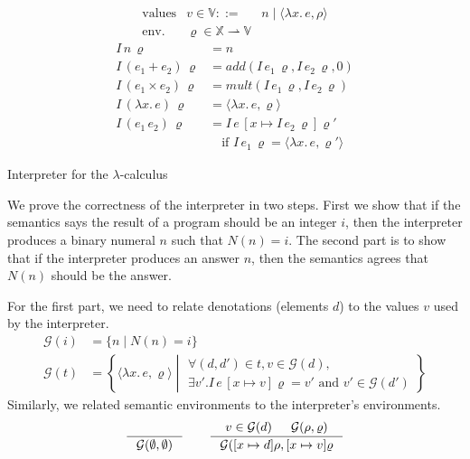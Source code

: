 \documentclass{tufte-handout}
\newcommand{\LAM}[1]{\lambda #1.\,}
\newcommand{\pto}[0]{\rightharpoonup}
\begin{document}
\begin{marginfigure}
\[
\begin{array}{lrl}
 \text{values} & v \in \mathbb{V} ::= & n \mid \langle \LAM{x}e, \rho \rangle \\
 \text{env.} & \varrho \in \mathbb{X} \pto \mathbb{V} 
\end{array}
\]
\begin{align*}
  I\,n\,\varrho &= n \\
  I\,(e_1 + e_2)\,\varrho &= \mathit{add}(I\,e_1\,\varrho, I\,e_2\,\varrho, 0) \\
  I\,(e_1 \times e_2)\,\varrho &= \mathit{mult}(I\,e_1\,\varrho, I\,e_2\,\varrho) \\
  I\,(\LAM{x}e)\,\varrho &= \langle \LAM{x}e, \varrho \rangle \\
  I\,(e_1\,e_2)\,\varrho &=  I\,e\,[x\mapsto I\,e_2\,\varrho]\varrho'\\
      & \quad \text{if } I\,e_1\,\varrho = \langle \LAM{x}e,\varrho' \rangle
\end{align*}

\caption{Interpreter for the $\lambda$-calculus}
\label{fig:interp-lambda}
\end{marginfigure}

We prove the correctness of the interpreter in two steps.  First we
show that if the semantics says the result of a program should be an
integer $i$, then the interpreter produces a binary numeral $n$ such
that $N(n) = i$. The second part is to show that if the interpreter
produces an answer $n$, then the semantics agrees that $N(n)$ should
be the answer.

For the first part, we need to relate denotations (elements $d$) to
the values $v$ used by the interpreter.
\begin{align*}
  \mathcal{G}(i) &= \{ n \mid N(n) = i \} \\
  \mathcal{G}(t) &= \left\{ \langle \LAM{x} e, \varrho \rangle \middle|
     \begin{array}{l}
       \forall (d,d') \in t, v \in \mathcal{G}(d),\\
       \exists v'. I\,e\,[x\mapsto v]\varrho = v'
               \text{ and } v'\in\mathcal{G}(d')
     \end{array} \right\}
\end{align*}
Similarly, we related semantic environments to the
interpreter's environments.
\[
  \inference{}{\mathcal{G}(\emptyset,\emptyset)}
  \qquad
  \inference{v \in \mathcal{G}(d) & \mathcal{G}(\rho,\varrho)}
            {\mathcal{G}([x\mapsto d] \rho, [x\mapsto v] \varrho}
\]
\end{document}
